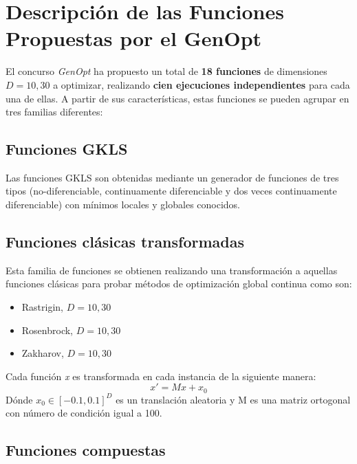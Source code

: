 \section{Descripción de las Funciones Propuestas por el GenOpt}
\label{sec:GENOPT}

El concurso \textit{GenOpt} ha propuesto un total de \textbf{18 funciones} de dimensiones $D = 10, 30$ a optimizar, realizando \textbf{cien ejecuciones independientes} para cada una de ellas. A partir de sus características, estas funciones se pueden agrupar en tres familias diferentes: 

\bigskip
\subsection{Funciones GKLS}\label{sec:GKLS}
Las funciones GKLS \cite{GKLS} son obtenidas mediante un generador de funciones de tres tipos (no-diferenciable, continuamente diferenciable y dos veces continuamente diferenciable) con mínimos locales y globales conocidos.
 
\subsection{Funciones clásicas transformadas}

Esta familia de funciones se obtienen realizando una transformación a aquellas funciones clásicas para probar métodos de optimización global continua como son:
    \begin{itemize}
    	\item Rastrigin, $D = 10, 30$ 
    	\item Rosenbrock, $D = 10, 30$ 
    	\item Zakharov, $D = 10, 30$ 
    \end{itemize}
    Cada función \textit{x} es transformada en cada instancia de la siguiente manera: 
    \begin{equation}
    x' = Mx + x_{0}
    \end{equation}
    Dónde $x_{0}\in[-0.1, 0.1]^{D}$ es un translación aleatoria y M es una matriz ortogonal con número de condición igual a 100.

\subsection{Funciones compuestas} 

